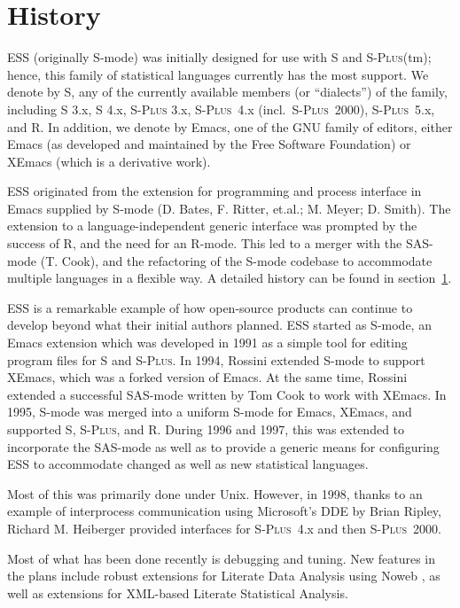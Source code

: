 \documentclass{article}
\newcommand*{\Splus}{\textsc{S-Plus}}
\begin{document}
\section{History}
\label{sec:history}

ESS (originally S-mode) was initially designed for use with S and
\Splus(tm); hence, this family of statistical languages currently has
the most support.  We denote by S, any of the currently available
members (or ``dialects'') of the family, including S 3.x, S 4.x, \Splus
3.x, \Splus~4.x (incl.\ \Splus~2000), \Splus~5.x, and R.  In addition, we
denote by Emacs, one of the GNU family of editors, either Emacs (as
developed and maintained by the Free Software Foundation) or XEmacs (which
is a derivative work).

ESS originated from the extension for programming and process
interface in Emacs supplied by S-mode (D. Bates, F. Ritter, et.al.; 
M. Meyer; D. Smith).  The extension to a language-independent generic
interface was prompted by the success of R, and the need for an
R-mode.  This led to a merger with the SAS-mode (T. Cook), and the
refactoring of the S-mode codebase to accommodate multiple languages
in a flexible way.  A detailed history can be found in
section~\ref{sec:history}.

ESS is a remarkable example of how open-source products can continue
to develop beyond what their initial authors planned.  ESS started as
S-mode, an Emacs extension which was developed in 1991 as a simple
tool for editing program files for S and \Splus.  In 1994, Rossini
extended S-mode to support XEmacs, which was a forked version of
Emacs.  At the same time, Rossini extended a successful SAS-mode
written by Tom Cook to work with XEmacs.  In 1995, S-mode was merged
into a uniform S-mode for Emacs, XEmacs, and supported S, \Splus, and
R. During 1996 and 1997, this was extended to incorporate the
SAS-mode as well as to provide a generic means for configuring ESS to
accommodate changed as well as new statistical languages.

Most of this was primarily done under Unix.  However, in 1998, thanks
to an example of interprocess communication using Microsoft's DDE by
Brian Ripley, Richard M. Heiberger provided interfaces for \Splus~4.x
and then \Splus~2000.

Most of what has been done recently is debugging and tuning.  New
features in the plans include robust extensions for Literate Data
Analysis using Noweb \citep{NRamsey:1994}, as well as extensions for
XML-based Literate Statistical Analysis.
\end{document}
